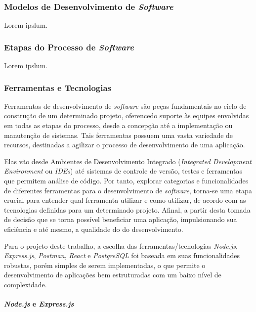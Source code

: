 \documentclass[english,brazilian]{UNISINOSartigo} %
\begin{document}
\subsubsection{Modelos de Desenvolvimento de \textit{Software}}

Lorem ipslum.

\subsubsection{Etapas do Processo de \textit{Software}}

Lorem ipslum.

\subsubsection{Ferramentas e Tecnologias}

Ferramentas de desenvolvimento de \textit{software} são peças fundamentais no ciclo de construção de um determinado projeto, oferencedo suporte às equipes envolvidas em todas as etapas do processo, desde a concepção até a implementação ou manutenção de sistemas. Tais ferramentas possuem uma vasta variedade de recursos, destinadas a agilizar o processo de desenvolvimento de uma aplicação.

Elas vão desde Ambientes de Desenvolvimento Integrado (\textit{Integrated Development Environment} ou \textit{IDEs}) até sistemas de controle de versão, testes e ferramentas que permitem análise de código. Por tanto, explorar categorias e funcionalidades de diferentes ferramentas para o desenvolvimento de \textit{software}, torna-se uma etapa crucial para entender qual ferramenta utilizar e como utilizar, de acordo com as tecnologias definidas para um determinado projeto. Afinal, a partir desta tomada de decisão que se torna possível beneficiar uma aplicação, impulsionando sua eficiência e até mesmo, a qualidade do do desenvolvimento.

Para o projeto deste trabalho, a escolha das ferramentas/tecnologias \textit{Node.js}, \textit{Express.js}, \textit{Postman}, \textit{React} e \textit{PostgreSQL} foi baseada em suas funcionalidades robustas, porém simples de serem implementadas, o que permite o desenvolvimento de aplicações bem estruturadas com um baixo nível de complexidade.

\setcounter{secnumdepth}{4} %
\setcounter{tocdepth}{4}    %

\paragraph{\textit{Node.js} e \textit{Express.js}}
\end{document}
